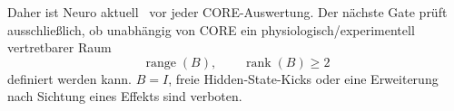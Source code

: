 Daher ist Neuro aktuell \BLOCKED\ vor jeder CORE-Auswertung. Der nächste Gate prüft ausschließlich, ob unabhängig von CORE ein physiologisch/experimentell vertretbarer Raum
\[
\operatorname{range}(B),\qquad \operatorname{rank}(B)\ge2
\]
definiert werden kann. $B=I$, freie Hidden-State-Kicks oder eine Erweiterung nach Sichtung eines Effekts sind verboten.
